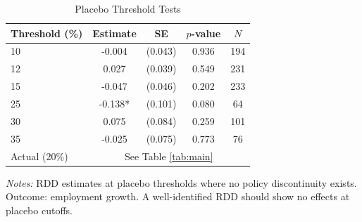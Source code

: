 \begin{table}[htbp]
\centering
\caption{Placebo Threshold Tests}
\label{tab:placebo}
\begin{tabular}{lcccc}
\toprule
Threshold (\%) & Estimate & SE & $p$-value & $N$ \\
\midrule
10 & -0.004 & (0.043) & 0.936 & 194 \\
12 & 0.027 & (0.039) & 0.549 & 231 \\
15 & -0.047 & (0.046) & 0.202 & 233 \\
25 & -0.138* & (0.101) & 0.080 & 64 \\
30 & 0.075 & (0.084) & 0.259 & 101 \\
35 & -0.025 & (0.075) & 0.773 & 76 \\
\midrule
Actual (20\%) & \multicolumn{4}{c}{See Table \ref{tab:main}} \\
\bottomrule
\end{tabular}
\begin{minipage}{0.85\textwidth}
\vspace{0.3em}
\footnotesize \textit{Notes:} RDD estimates at placebo thresholds where no policy discontinuity exists.
Outcome: employment growth. A well-identified RDD should show no effects at placebo cutoffs.
\end{minipage}
\end{table}
